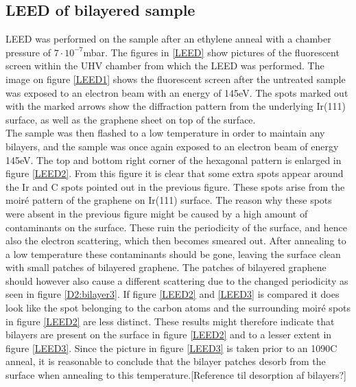 \subsection{LEED of bilayered sample}
LEED was performed on the sample after an ethylene anneal with a chamber pressure of $7\cdot 10^{-7}$mbar. The figures in \ref{LEED} show pictures of the fluorescent screen within the UHV chamber from which the LEED was performed. The image on figure \ref{LEED1} shows the fluorescent screen after the untreated sample was exposed to an electron beam with an energy of 145eV. The spots marked out with the marked arrows show the diffraction pattern from the underlying Ir(111) surface, as well as the graphene sheet on top of the surface.\cite{1367-2630-10-4-043033}\\
The sample was then flashed to a low temperature in order to maintain any bilayers, and the sample was once again exposed to an electron beam of energy 145eV. The top and bottom right corner of the hexagonal pattern is enlarged in figure \ref{LEED2}. From this figure it is clear that some extra spots appear around the Ir and C spots pointed out in the previous figure. These spots arise from the moiré pattern of the graphene on Ir(111) surface. The reason why these spots were absent in the previous figure might be caused by a high amount of contaminants on the surface. These ruin the periodicity of the surface, and hence also the electron scattering, which then becomes smeared out. After annealing to a low temperature these contaminants should be gone, leaving the surface clean with small patches of bilayered graphene. The patches of bilayered graphene should however also cause a different scattering due to the changed periodicity as seen in figure \ref{D2:bilayer3}. If figure \ref{LEED2} and \ref{LEED3} is compared it does look like the spot belonging to the carbon atoms and the surrounding moiré spots in figure \ref{LEED2} are less distinct. These results might therefore indicate that bilayers are present on the surface in figure \ref{LEED2} and to a lesser extent in figure \ref{LEED3}. Since the picture in figure \ref{LEED3} is taken prior to an 1090\degree C anneal, it is reasonable to conclude that the bilayer patches desorb from the surface when annealing to this temperature.[Reference til desorption af bilayers?]

